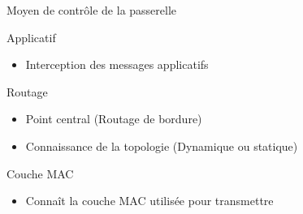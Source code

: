 
\begin{frame}{Moyen de contrôle de la passerelle}
  \begin{block}{Applicatif}
    \begin{itemize}
      \item Interception des messages applicatifs
    \end{itemize}
  \end{block}
  \begin{block}{Routage}
    \begin{itemize}
      \item Point central (Routage de bordure)
      \item Connaissance de la topologie (Dynamique ou statique)
    \end{itemize}
  \end{block}
  \begin{block}{Couche MAC}
    \begin{itemize}
      \item Connaît la couche MAC utilisée pour transmettre
    \end{itemize}
  \end{block}
\end{frame}

